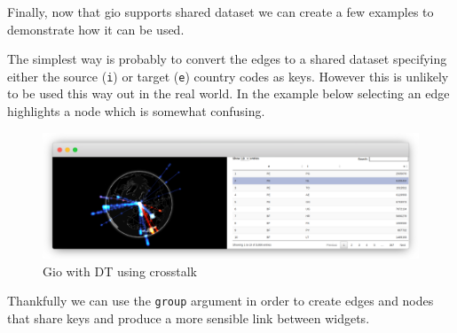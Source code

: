 \documentclass[
]{krantz}
\makeatletter
\newenvironment{Shaded}{\begin{snugshade}}{\end{snugshade}}
\newcommand{\CommentTok}[1]{\textcolor[rgb]{0.37,0.37,0.37}{\textit{#1}}}
\newcommand{\DataTypeTok}[1]{\textcolor[rgb]{0.27,0.27,0.27}{#1}}
\newcommand{\KeywordTok}[1]{\textcolor[rgb]{0.27,0.27,0.27}{\textbf{#1}}}
\newcommand{\NormalTok}[1]{#1}
\newcommand{\OperatorTok}[1]{\textcolor[rgb]{0.43,0.43,0.43}{\textbf{#1}}}
\newcommand{\StringTok}[1]{\textcolor[rgb]{0.5,0.5,0.5}{#1}}
\newenvironment{kframe}{%
\medskip{}
\setlength{\fboxsep}{.8em}
 \def\at@end@of@kframe{}%
 \ifinner\ifhmode%
  \def\at@end@of@kframe{\end{minipage}}%
  \begin{minipage}{\columnwidth}%
 \fi\fi%
 \def\FrameCommand##1{\hskip\@totalleftmargin \hskip-\fboxsep
 \colorbox{shadecolor}{##1}\hskip-\fboxsep
     \hskip-\linewidth \hskip-\@totalleftmargin \hskip\columnwidth}%
 \MakeFramed {\advance\hsize-\width
   \@totalleftmargin\z@ \linewidth\hsize
   \@setminipage}}%
 {\par\unskip\endMakeFramed%
 \at@end@of@kframe}
\renewenvironment{Shaded}{\begin{kframe}}{\end{kframe}}
\makeatother
\begin{document}
Finally, now that gio supports shared dataset we can create a few examples to demonstrate how it can be used.

The simplest way is probably to convert the edges to a shared dataset specifying either the source (\texttt{i}) or target (\texttt{e}) country codes as keys. However this is unlikely to be used this way out in the real world. In the example below selecting an edge highlights a node which is somewhat confusing.

\begin{Shaded}
\end{Shaded}

\begin{figure}
\centering
\includegraphics{images/crosstalk-gio-1.png}
\caption{Gio with DT using crosstalk}
\end{figure}

Thankfully we can use the \texttt{group} argument in order to create edges and nodes that share keys and produce a more sensible link between widgets.
\end{document}
